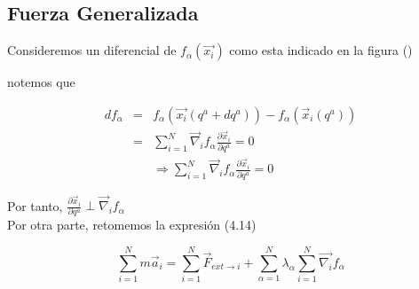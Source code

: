 \documentclass[12pt]{report}
\begin{document}
\subsection{Fuerza Generalizada}	


Consideremos un diferencial de $f_\alpha(\vec{x_i})$ como esta indicado  en la figura () 


\begin{figure}[h]
 \centering
 \label{f:animales}
\end{figure}

notemos que 

\begin{eqnarray}
df_{\alpha}&=&f_{\alpha}\left(\vec{x_i}\left(q^a+dq^a\right)\right)-f_{\alpha}(\vec{x}_i(q^a)) \\
&=& \sum_{i=1}^N \vec{\nabla}_{i} f_{\alpha} \frac{\partial \vec{x}_i }{\partial q^a}=0 \\
&&\Rightarrow \sum_{i=1}^N \vec{\nabla}_{i} f_{\alpha} \frac{\partial{\vec{x}_i}}{{\partial q^a}} = 0
\end{eqnarray}


Por tanto,  $\displaystyle\frac{\partial \vec{x}_i}{\partial q^a} \perp \vec{\nabla}_{i} f_{\alpha}$ \\

Por otra parte, retomemos la expresión (4.14)

\begin{equation}
\sum_{i=1}^N m\vec{a}_i = \sum_{i=1}^N \vec{F}_{ext \rightarrow i} + \sum_{\alpha=1}^N \lambda_{\alpha} \sum_{i=1}^N \vec{\nabla_{i}} f_{\alpha} 
\end{equation}
\end{document}
